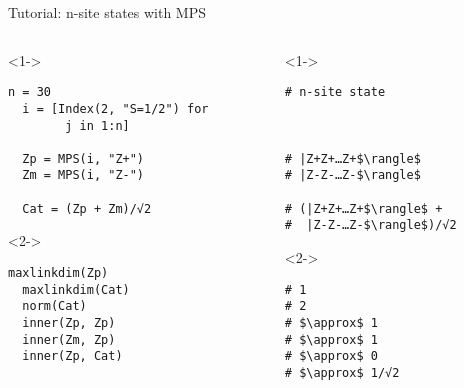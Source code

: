\begin{frame}[fragile]{Tutorial: n-site states with MPS}


\begin{columns}

\begin{column}{5cm}

\begin{onlyenv}<1->

\begin{lstlisting}[language=JuliaLocal, style=julia, mathescape, basicstyle=\small]
  n = 30
  i = [Index(2, "S=1/2") for
        j in 1:n]

  Zp = MPS(i, "Z+")
  Zm = MPS(i, "Z-")

  Cat = (Zp + Zm)/√2
 \end{lstlisting}

\end{onlyenv}

\begin{onlyenv}<2->

\begin{lstlisting}[language=JuliaLocal, style=julia, mathescape, basicstyle=\small]
  maxlinkdim(Zp)
  maxlinkdim(Cat)
  norm(Cat)
  inner(Zp, Zp)
  inner(Zm, Zp)
  inner(Zp, Cat)
\end{lstlisting}

\end{onlyenv}

\end{column}

\begin{column}{5cm}

\begin{onlyenv}<1->

\begin{lstlisting}[style=julia, numbers=none, mathescape, basicstyle=\small]
# n-site state



# |Z+Z+…Z+$\rangle$
# |Z-Z-…Z-$\rangle$

# (|Z+Z+…Z+$\rangle$ +
#  |Z-Z-…Z-$\rangle$)/√2
\end{lstlisting}

\end{onlyenv}

\begin{onlyenv}<2->

\begin{lstlisting}[style=julia, numbers=none, mathescape, basicstyle=\small]
# 1
# 2
# $\approx$ 1
# $\approx$ 1
# $\approx$ 0
# $\approx$ 1/√2
\end{lstlisting}

\end{onlyenv}

\end{column}

\end{columns}

\end{frame}
